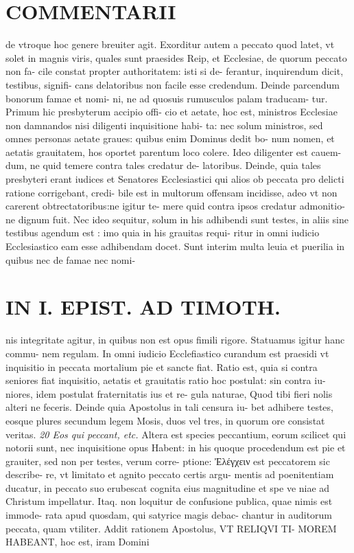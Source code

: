 \documentclass{article}
\begin{document}
\begin{pages}
\section*{COMMENTARII }
\marginpar{[ p.134 ]}\pstart de vtroque hoc genere breuiter agit.  \pend\pstart Exorditur autem a peccato quod latet, vt solet in magnis viris, quales sunt praesides Reip, et Ecclesiae, de quorum peccato non fa- cile constat propter authoritatem: isti si de- ferantur, inquirendum dicit, testibus, signifi- cans delatoribus non facile esse credendum. Deinde parcendum bonorum famae et nomi- ni, ne ad quosuis rumusculos palam traducam- tur. Primum hic presbyterum accipio offi- cio et aetate, hoc est, ministros Ecclesiae non damnandos nisi diligenti inquisitione habi- ta: nec solum ministros, sed omnes personas aetate graues: quibus  enim Dominus dedit bo- num nomen, et aetatis grauitatem, hos oportet parentum loco colere. Ideo diligenter est cauem- dum, ne quid temere contra tales credatur de- latoribus. Deinde, quia tales presbyteri erant iudices et Senatores Ecclesiastici qui alios ob peccata pro delicti ratione corrigebant, credi- bile est in multorum offensam incidisse, adeo vt non carerent obtrectatoribus:ne igitur te- mere quid contra ipsos credatur admonitio- ne dignum fuit. Nec ideo sequitur, solum in his adhibendi sunt testes, in aliis sine testibus agendum est : imo quia in his grauitas requi- ritur in omni iudicio Ecclesiastico eam esse adhibendam docet. Sunt interim multa leuia et puerilia in quibus nec de famae nec nomi-  \pend
\section*{IN I. EPIST. AD TIMOTH. }
\marginpar{[ p.135. ]}\pstart nis integritate agitur, in quibus non est opus fimili rigore. Statuamus igitur hanc commu- nem regulam. In omni iudicio Ecclefiastico curandum est praesidi vt inquisitio in peccata mortalium pie et sancte fiat. Ratio est, quia si contra seniores fiat inquisitio, aetatis et grauitatis ratio hoc postulat: sin contra iu- niores, idem postulat fraternitatis ius et re- gula naturae, Quod tibi fieri nolis alteri ne feceris.  \pend\pstart Deinde quia Apostolus in tali censura iu- bet adhibere testes, eosque plures secundum legem Mosis, duos vel tres, in quorum ore consistat veritas.  \pend
\textit{20 Eos qui peccant, etc. }\pstart Altera est species peccantium, eorum scilicet qui notorii sunt, nec inquisitione opus Habent: in his quoque procedendum est pie et grauiter, sed non per testes, verum corre- ptione: Ἐλέγχειν est peccatorem sic describe- re, vt limitato et agnito peccato certis argu- mentis ad poenitentiam ducatur, in peccato suo erubescat cognita eius magnitudine et spe ve niae ad Christum impellatur. Itaq. non loquitur de confusione publica, quae nimis est immode- rata apud quosdam, qui satyrice magis debac- chantur in auditorum peccata, quam vtiliter. Addit rationem Apostolus, VT RELIQVI TI- MOREM HABEANT, hoc est, iram Domini  \pend

\end{pages}
\end{document}
